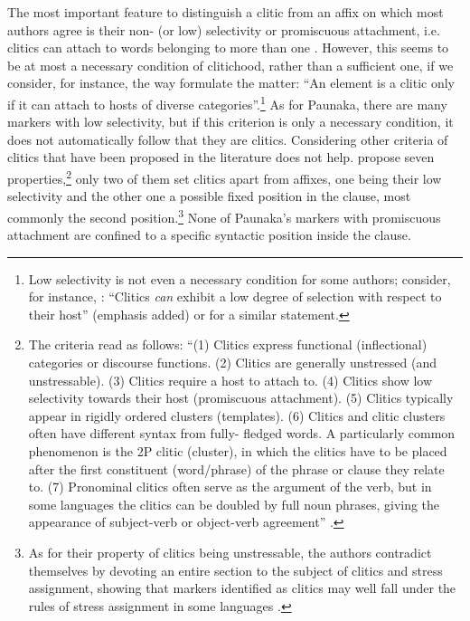 The most important feature to distinguish a clitic from an affix on which most authors agree is their non- (or low) selectivity or promiscuous attachment, i.e. clitics can attach to words belonging to more than one . However, this seems to be at most a necessary condition of clitichood, rather than a sufficient one, if we consider, for instance, the way \citet[176]{BickelNichols2007} formulate the matter: “An element is a clitic only if it can attach to hosts of diverse categories”.\footnote{Low selectivity is not even a necessary condition for some authors; consider, for instance, \citet[503]{ZwickyPullum1983}: “Clitics \textit{can} exhibit a low degree of selection with respect to their host” (emphasis added) or \citet[44]{Aikhenvald2003a} for a similar statement.} As for Paunaka, there are many markers with low selectivity, but if this criterion is only a necessary condition, it does not automatically follow that they are clitics. Considering other criteria of clitics that have been proposed in the literature does not help. \citet[37]{SpencerLuis2012} propose seven properties,\footnote{The criteria read as follows: “(1) Clitics express functional (inflectional) categories or discourse functions. (2) Clitics are generally unstressed (and unstressable). (3) Clitics require a host to attach to. (4) Clitics show low selectivity towards their host (promiscuous attachment). (5) Clitics typically appear in rigidly ordered clusters (templates). (6) Clitics and clitic clusters often have different syntax from fully-
fledged words. A particularly common phenomenon is the 2P clitic (cluster), in which the clitics have to be placed after the first constituent (word/phrase) of the phrase or clause they relate to. (7) Pronominal clitics often serve as the argument of the verb, but in some languages the clitics can be doubled by full noun phrases, giving the appearance of subject-verb or object-verb agreement” \citep[37]{SpencerLuis2012}.} only two of them set clitics apart from affixes, one being their low selectivity and the other one a possible fixed position in the clause, most commonly the second position.\footnote{As for their property of clitics being unstressable, the authors contradict themselves by devoting an entire section to the subject of clitics and stress assignment, showing that markers identified as clitics may well fall under the rules of stress assignment in some languages \citep[cf.][84--92]{SpencerLuis2012}.} None of Paunaka’s markers with promiscuous attachment are confined to a specific syntactic position inside the clause.

